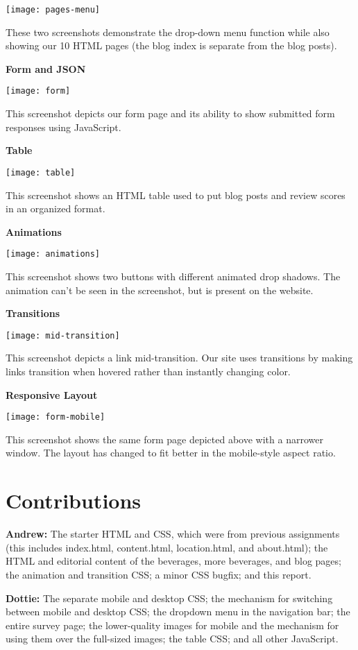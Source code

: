 \documentclass[12pt]{article}
\begin{document}
\texttt{[image: pages-menu]}

These two screenshots demonstrate the drop-down menu function while also
showing our 10 HTML pages (the blog index is separate from the blog posts).

\textbf{Form and JSON}

\texttt{[image: form]}

This screenshot depicts our form page and its ability to show submitted form responses
using JavaScript.

\textbf{Table}

\texttt{[image: table]}

This screenshot shows an HTML table used to put blog posts and review scores
in an organized format.

\textbf{Animations}

\texttt{[image: animations]}

This screenshot shows two buttons with different animated drop shadows.
The animation can't be seen in the screenshot, but is present on the website.

\textbf{Transitions}

\texttt{[image: mid-transition]}

This screenshot depicts a link mid-transition. Our site uses transitions by
making links transition when hovered rather than instantly changing color.


\textbf{Responsive Layout}

\texttt{[image: form-mobile]}

This screenshot shows the same form page depicted above with a narrower
window. The layout has changed to fit better in the mobile-style
aspect ratio.


\section{Contributions}
\textbf{Andrew:}
The starter HTML and CSS, which were from previous assignments (this includes index.html, content.html, location.html, and about.html); the HTML and editorial content of the beverages, more beverages, and blog pages; the animation and transition CSS; a minor CSS bugfix; and this report.

\textbf{Dottie:}
The separate mobile and desktop CSS; the mechanism for switching between mobile and desktop CSS; the dropdown menu in the navigation bar; the entire survey page; the lower-quality images for mobile and the mechanism for using them over the full-sized images; the table CSS; and all other JavaScript.
\end{document}
